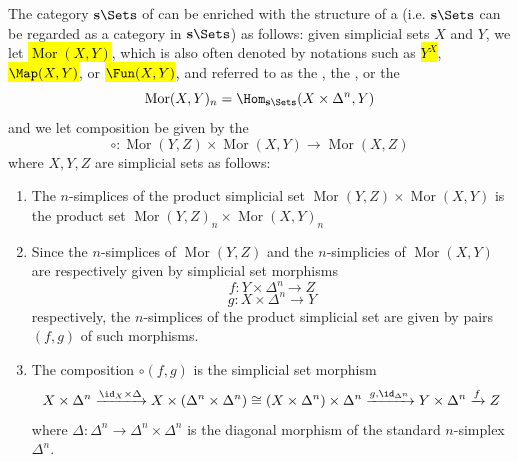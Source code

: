 \begin{definition} \label{definition:simplicial_category_of_simplicial_sets}
    The category $\mathbf{s}\Sets$ of  can be enriched with the structure of a  
    (i.e. $\mathbf{s}\Sets$ can be regarded as a category  in $\mathbf{s}\Sets$) as follows: given simplicial sets $X$ and $Y$, we let \hl{$\operatorname{Mor}(X,Y)$}, which is also often denoted by notations such as \hl{$Y^X$}, \hl{$\Map(X,Y)$}, or \hl{$\Fun(X,Y)$}, and referred to as the , the , or the 
    $$\operatorname{Mor}(X,Y)_n = \Hom_{\mathbf{s}\Sets}(X \times \Delta^n, Y)$$
    and we let composition be given by the 
    $$\circ: \operatorname{Mor}(Y,Z) \times \operatorname{Mor}(X,Y) \to \operatorname{Mor}(X,Z)$$
    where $X,Y,Z$ are simplicial sets as follows:
    \begin{enumerate}
        \item The $n$-simplices of the product simplicial set $\operatorname{Mor}(Y,Z) \times \operatorname{Mor}(X,Y)$ is the product set $\operatorname{Mor}(Y,Z)_n \times \operatorname{Mor}(X,Y)_n$

        \item Since the $n$-simplices of $\operatorname{Mor}(Y,Z)$ and the $n$-simplicies of $\operatorname{Mor}(X,Y)$ are respectively given by simplicial set morphisms
        $$f: Y \times \Delta^n \to Z$$
        $$g: X \times \Delta^n \to Y$$
        respectively, the $n$-simplices of the product simplicial set are given by pairs $(f,g)$ of such morphisms.
        \item The composition $\circ(f,g)$ is the simplicial set morphism
        $$X \times \Delta^n \xrightarrow{\id_X \times \Delta} X \times (\Delta^n \times \Delta^n) \cong (X \times \Delta^n) \times \Delta^n \xrightarrow{g, \id_{\Delta^n}} Y \times \Delta^n \xrightarrow{f} Z$$
        where $\Delta: \Delta^n \to \Delta^n \times \Delta^n$ is the diagonal morphism of the standard $n$-simplex $\Delta^n$.
    \end{enumerate}


\end{definition}

